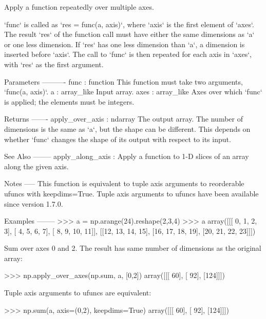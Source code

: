 \begin{DoxyVerb}Apply a function repeatedly over multiple axes.

`func` is called as `res = func(a, axis)`, where `axis` is the first
element of `axes`.  The result `res` of the function call must have
either the same dimensions as `a` or one less dimension.  If `res`
has one less dimension than `a`, a dimension is inserted before
`axis`.  The call to `func` is then repeated for each axis in `axes`,
with `res` as the first argument.

Parameters
----------
func : function
    This function must take two arguments, `func(a, axis)`.
a : array_like
    Input array.
axes : array_like
    Axes over which `func` is applied; the elements must be integers.

Returns
-------
apply_over_axis : ndarray
    The output array.  The number of dimensions is the same as `a`,
    but the shape can be different.  This depends on whether `func`
    changes the shape of its output with respect to its input.

See Also
--------
apply_along_axis :
    Apply a function to 1-D slices of an array along the given axis.

Notes
-----
This function is equivalent to tuple axis arguments to reorderable ufuncs
with keepdims=True. Tuple axis arguments to ufuncs have been available since
version 1.7.0.

Examples
--------
>>> a = np.arange(24).reshape(2,3,4)
>>> a
array([[[ 0,  1,  2,  3],
        [ 4,  5,  6,  7],
        [ 8,  9, 10, 11]],
       [[12, 13, 14, 15],
        [16, 17, 18, 19],
        [20, 21, 22, 23]]])

Sum over axes 0 and 2. The result has same number of dimensions
as the original array:

>>> np.apply_over_axes(np.sum, a, [0,2])
array([[[ 60],
        [ 92],
        [124]]])

Tuple axis arguments to ufuncs are equivalent:

>>> np.sum(a, axis=(0,2), keepdims=True)
array([[[ 60],
        [ 92],
        [124]]])\end{DoxyVerb}
 \mbox{\label{namespacenumpy_1_1lib_1_1shape__base_a783a47e5d4c03f1ed6276f74b3b538c1}} 
